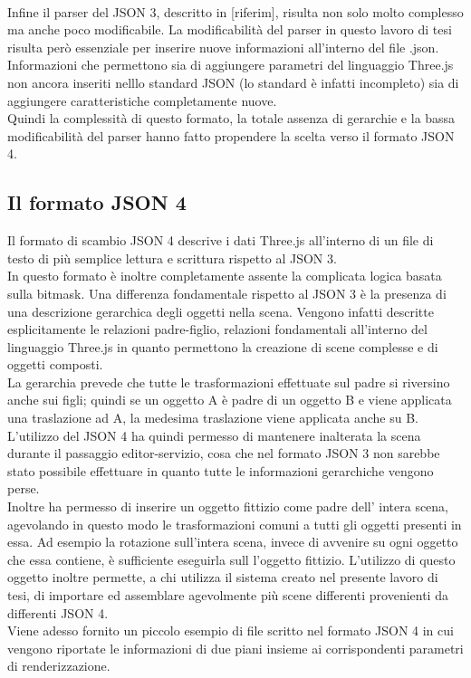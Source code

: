 \\
Infine il parser del JSON 3, descritto in [riferim], risulta non solo molto complesso ma anche poco modificabile. La modificabilità del parser in questo lavoro di tesi risulta però essenziale per inserire nuove informazioni all’interno del file .json. Informazioni che permettono sia di aggiungere parametri del linguaggio Three.js non ancora inseriti nelllo standard JSON (lo standard è infatti incompleto) sia di aggiungere caratteristiche completamente nuove.
\\
Quindi la complessità di questo formato, la totale assenza di gerarchie e la bassa modificabilità del parser hanno fatto propendere la scelta verso il formato JSON 4.

\subsection{Il formato JSON 4}

Il formato di scambio JSON 4 descrive i dati Three.js all’interno di un file di testo di più semplice lettura e scrittura rispetto al JSON 3.
\\
In questo formato è inoltre completamente assente la complicata logica basata sulla bitmask.
Una differenza fondamentale rispetto al JSON 3 è la presenza di una descrizione gerarchica degli oggetti nella scena. Vengono infatti descritte esplicitamente le relazioni padre-figlio, relazioni fondamentali all’interno del linguaggio Three.js in quanto permettono la creazione di scene complesse e di oggetti composti.
\\
La gerarchia prevede che tutte le trasformazioni effettuate sul padre si riversino anche sui figli; quindi se un oggetto A è padre di un oggetto B e viene applicata una traslazione ad A, la medesima traslazione viene applicata anche su B. 
\\
L’utilizzo del JSON 4 ha quindi permesso di mantenere inalterata la scena durante il passaggio editor-servizio, cosa che nel formato JSON 3 non sarebbe stato possibile effettuare in quanto tutte le informazioni gerarchiche vengono perse. 
\\
Inoltre ha permesso di inserire un oggetto fittizio come padre dell’ intera scena, agevolando in questo modo le trasformazioni comuni a tutti gli oggetti presenti in essa. 
Ad esempio la rotazione sull’intera scena, invece di avvenire su ogni oggetto che essa contiene, è sufficiente eseguirla sull l’oggetto fittizio.
L’utilizzo di questo oggetto inoltre permette, a chi utilizza il sistema creato nel presente lavoro di tesi, di importare ed assemblare agevolmente più scene differenti provenienti da differenti JSON 4. 
\\
Viene adesso fornito un piccolo esempio di file scritto nel formato JSON 4 in cui vengono riportate le informazioni di due piani insieme ai corrispondenti parametri di renderizzazione.




